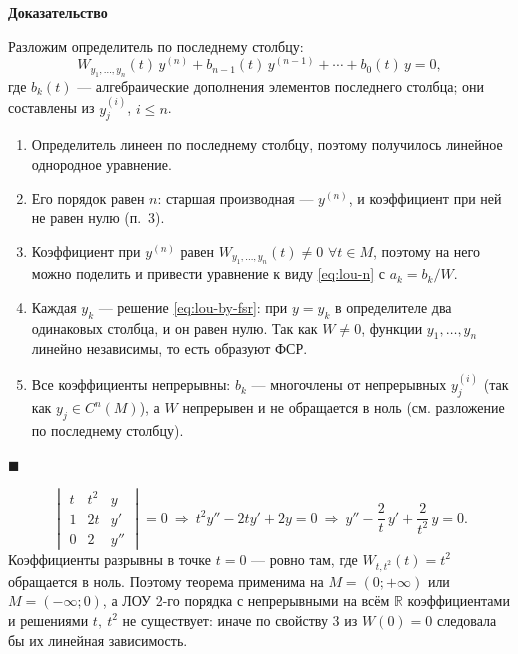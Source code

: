 \documentclass[12pt,a4paper]{article}
\numberwithin{equation}{section}
\newcommand{\R}{\mathbb{R}}
\renewenvironment{proof}[1][Доказательство]{\begin{center}\textbf{#1}\end{center}}{\hfill$\blacksquare$\par}
\begin{document}
\begin{proof}
Разложим определитель по последнему столбцу:
\[
W_{y_1,\ldots,y_n}(t)\,y^{(n)}+b_{n-1}(t)\,y^{(n-1)}+\cdots+b_0(t)\,y=0,
\]
где \(b_k(t)\) --- алгебраические дополнения элементов последнего столбца; они составлены из \(y_j^{(i)}\), \(i\leq n\).
\begin{enumerate}
\item Определитель линеен по последнему столбцу, поэтому получилось линейное однородное уравнение.
\item Его порядок равен \(n\): старшая производная --- \(y^{(n)}\), и коэффициент при ней не равен нулю (п.~3).
\item Коэффициент при \(y^{(n)}\) равен \(W_{y_1,\ldots,y_n}(t)\neq0\) \(\forall t\in M\), поэтому на него можно поделить и привести уравнение к виду \eqref{eq:lou-n} с \(a_k=b_k/W\).
\item Каждая \(y_k\) --- решение \eqref{eq:lou-by-fsr}: при \(y=y_k\) в определителе два одинаковых столбца, и он равен нулю. Так как \(W\neq0\), функции \(y_1,\ldots,y_n\) линейно независимы, то есть образуют ФСР.
\item Все коэффициенты непрерывны: \(b_k\) --- многочлены от непрерывных \(y_j^{(i)}\) (так как \(y_j\in C^n(M)\)), а \(W\) непрерывен и не обращается в ноль (см. разложение по последнему столбцу).
\end{enumerate}
\end{proof}

\begin{exampleHSE}
\[
\begin{vmatrix}t&t^2&y\\1&2t&y'\\0&2&y''\end{vmatrix}=0
\ \Longrightarrow\
t^2y''-2ty'+2y=0
\ \Longrightarrow\
y''-\frac{2}{t}\,y'+\frac{2}{t^2}\,y=0.
\]
Коэффициенты разрывны в точке \(t=0\) --- ровно там, где \(W_{t,t^2}(t)=t^2\) обращается в ноль. Поэтому теорема применима на \(M=(0;+\infty)\) или \(M=(-\infty;0)\), а ЛОУ 2-го порядка с непрерывными на всём \(\R\) коэффициентами и решениями \(t,\ t^2\) не существует: иначе по свойству 3 из \(W(0)=0\) следовала бы их линейная зависимость.
\end{exampleHSE}
\end{document}
